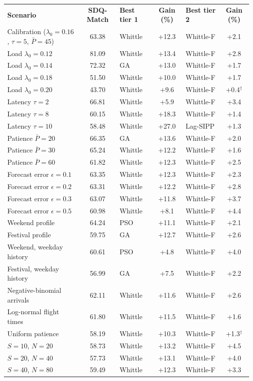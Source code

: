 \begin{tabular}{|l|c|l|c|l|c|}
\hline
\textbf{Scenario} & \textbf{SDQ-Match} & \textbf{Best tier 1} & \textbf{Gain (\%)} & \textbf{Best tier 2} & \textbf{Gain (\%)} \\ \thickhline
Calibration ($\lambda_0=0.16$, $\tau=5$, $\bar P=45$) & 63.38 & Whittle & +12.3 & Whittle-F & +2.1 \\ \hline
Load $\lambda_0=0.12$ & 81.09 & Whittle & +13.4 & Whittle-F & +2.8 \\ \hline
Load $\lambda_0=0.14$ & 72.32 & GA & +13.0 & Whittle-F & +1.7 \\ \hline
Load $\lambda_0=0.18$ & 51.50 & Whittle & +10.0 & Whittle-F & +1.7 \\ \hline
Load $\lambda_0=0.20$ & 43.70 & Whittle & +9.6 & Whittle-F & +0.4$^{\dagger}$ \\ \hline
Latency $\tau=2$ & 66.81 & Whittle & +5.9 & Whittle-F & +3.4 \\ \hline
Latency $\tau=8$ & 60.15 & Whittle & +18.3 & Whittle-F & +1.4 \\ \hline
Latency $\tau=10$ & 58.48 & Whittle & +27.0 & Lag-SIPP & +1.3 \\ \hline
Patience $\bar P=20$ & 66.35 & GA & +13.6 & Whittle-F & +2.0 \\ \hline
Patience $\bar P=30$ & 65.24 & Whittle & +12.2 & Whittle-F & +1.6 \\ \hline
Patience $\bar P=60$ & 61.82 & Whittle & +12.3 & Whittle-F & +2.5 \\ \hline
Forecast error $\epsilon=0.1$ & 63.35 & Whittle & +12.3 & Whittle-F & +2.3 \\ \hline
Forecast error $\epsilon=0.2$ & 63.31 & Whittle & +12.2 & Whittle-F & +2.8 \\ \hline
Forecast error $\epsilon=0.3$ & 63.07 & Whittle & +11.8 & Whittle-F & +3.7 \\ \hline
Forecast error $\epsilon=0.5$ & 60.98 & Whittle & +8.1 & Whittle-F & +4.4 \\ \hline
Weekend profile & 64.24 & PSO & +11.1 & Whittle-F & +2.1 \\ \hline
Festival profile & 59.75 & GA & +12.7 & Whittle-F & +2.6 \\ \hline
Weekend, weekday history & 60.61 & PSO & +4.8 & Whittle-F & +4.0 \\ \hline
Festival, weekday history & 56.99 & GA & +7.5 & Whittle-F & +2.2 \\ \hline
Negative-binomial arrivals & 62.11 & Whittle & +11.6 & Whittle-F & +2.6 \\ \hline
Log-normal flight times & 61.80 & Whittle & +11.5 & Whittle-F & +1.6 \\ \hline
Uniform patience & 58.19 & Whittle & +10.3 & Whittle-F & +1.3$^{\dagger}$ \\ \hline
$S=10$, $N=20$ & 58.73 & Whittle & +13.2 & Whittle-F & +4.5 \\ \hline
$S=20$, $N=40$ & 57.73 & Whittle & +13.1 & Whittle-F & +4.0 \\ \hline
$S=40$, $N=80$ & 59.49 & Whittle & +12.3 & Whittle-F & +3.3 \\ \hline
\end{tabular}